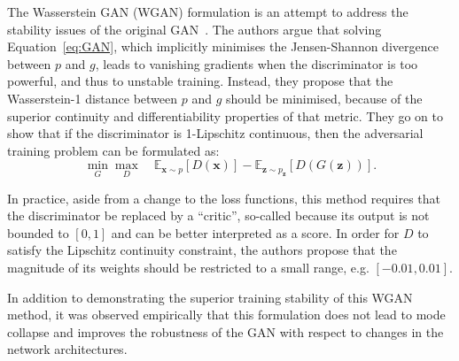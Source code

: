 
The Wasserstein GAN (WGAN) formulation is an attempt to address the stability
issues of the original GAN~\cite{arjovsky2017wasserstein}. The authors argue
that solving Equation~\ref{eq:GAN}, which implicitly minimises the
Jensen-Shannon divergence between $p$ and $g$, leads to vanishing gradients when
the discriminator is too powerful, and thus to unstable training. Instead, they
propose that the Wasserstein-1 distance between $p$ and $g$
should be minimised, because of the superior continuity and differentiability
properties of that metric. They go on to show that if the discriminator is
1-Lipschitz continuous, then the adversarial training problem can
be formulated as:
\begin{equation}
    \min_G \max_D \quad
    \mathbb{E}_{\bm{x} \sim p} \left[ D(\bm{x}) \right] -
    \mathbb{E}_{\bm{z} \sim p_{\bm{z}}} \left[ D(G(\bm{z})) \right].
\end{equation}

In practice, aside from a change to the loss functions, this method requires
that the discriminator be replaced by a ``critic'', so-called because its output
is not bounded to $[0, 1]$ and can be better interpreted as a score. In order
for $D$ to satisfy the Lipschitz continuity constraint, the authors propose that
the magnitude of its weights should be restricted to a small range, e.g.
$[-0.01, 0.01]$.

In addition to demonstrating the superior training stability of this WGAN
method, it was observed empirically that this formulation does not lead to mode
collapse and improves the robustness of the GAN with respect to changes in the
network architectures.

